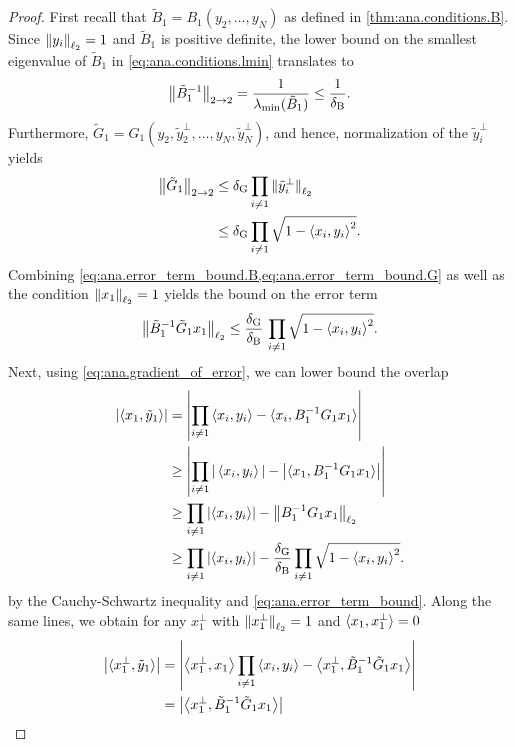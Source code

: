 \begin{proof}
  First recall that $\tilde B_1 = B_1(y_2, \ldots, y_N)$ as defined in \cref{thm:ana.conditions.B}.
  Since ${\Vert y_i\Vert}_{\ell_2} = 1$ and $\tilde B_1$ is positive definite, the lower bound on the smallest eigenvalue of $\tilde B_1$ in \cref{eq:ana.conditions.lmin} translates to
  \[
    \label{eq:ana.error_term_bound.B}
    {\left\Vert\tilde B_1^{-1}\right\Vert}_{2 \to 2} = \frac{1}{\lambda_\mathrm{min}(\tilde B_1)} \le \frac{1}{\delta_\mathrm{B}}.
  \]
  Furthermore, $\tilde G_1 = G_1(y_2, \tilde y_2^\perp, \ldots, y_N, \tilde y_N^\perp)$, and hence, normalization of the $\tilde y_i^\perp$ yields
  \[
    \label{eq:ana.error_term_bound.G}
    \begin{split}
      {\left\Vert\tilde G_1\right\Vert}_{2 \to 2}
      &\le \delta_\mathrm{G} \prod_{i \neq 1} {\Vert\tilde y_i^\perp\Vert}_{\ell_2} \\
      &\le \delta_\mathrm{G} \prod_{i \neq 1} \sqrt{1 - {\braket{x_i, y_i}}^2}.
    \end{split}
  \]
  Combining \cref{eq:ana.error_term_bound.B,eq:ana.error_term_bound.G} as well as the condition ${\Vert x_1\Vert}_{\ell_2} = 1$ yields the bound on the error term
  \[
    \label{eq:ana.error_term_bound}
    {\left\Vert\tilde B_1^{-1} \tilde G_1 x_1\right\Vert}_{\ell_2}
    \leq \frac{\delta_\mathrm{G}}{\delta_\mathrm{B}} \, \prod_{i \neq 1} \sqrt{1 - {\braket{x_i, y_i}}^2}.
  \]
  Next, using \cref{eq:ana.gradient_of_error}, we can lower bound the overlap
  \begin{align}
    {\left\vert\braket{x_1, \tilde y_1}\right\vert}
    &= {\left\vert\prod_{i \neq 1} \braket{x_i, y_i} - \braket{x_i, B_1^{-1} G_1 x_1}\right\vert} \\
    &\ge {\left\vert\prod_{i \neq 1} {\vert\braket{x_i, y_i}\vert} - {\left\vert\braket{x_1, B_1^{-1} G_1 x_1}\right\vert}\right\vert} \\
    &\ge {\prod_{i \neq 1} {\left\vert\braket{x_i, y_i}\right\vert} - {\left\Vert B_1^{-1} G_1 x_1\right\Vert}_{\ell_2}} \\
    &\ge {\prod_{i \neq 1} {\left\vert\braket{x_i, y_i}\right\vert} - \frac{\delta_\mathrm{G}}{\delta_\mathrm{B}} \prod_{i \neq 1} \sqrt{1 - {\braket{x_i, y_i}}^2}}.
    \label{eq:ana.local_error_bound_step.overlap_x}
  \end{align}
  by the Cauchy-Schwartz inequality and \cref{eq:ana.error_term_bound}.
  Along the same lines, we obtain for any $x_1^\perp$ with ${\Vert x_1^\perp\Vert}_{\ell_2} = 1$ and $\braket{x_1, x_1^\perp} = 0$
  \begin{align}
    \Abs{\braket{x_1^\perp, \tilde y_1}}
    &= \Abs{\Braket{x_1^\perp, x_1} \prod_{i \neq 1} \Braket{x_i, y_i} - \Braket{x_1^\perp, \tilde B_1^{-1} \tilde G_1 x_1}} \\
    &= \Abs{\Braket{x_1^\perp, \tilde B_1^{-1} \tilde G_1 x_1}} \\

\end{align}
\end{proof}
